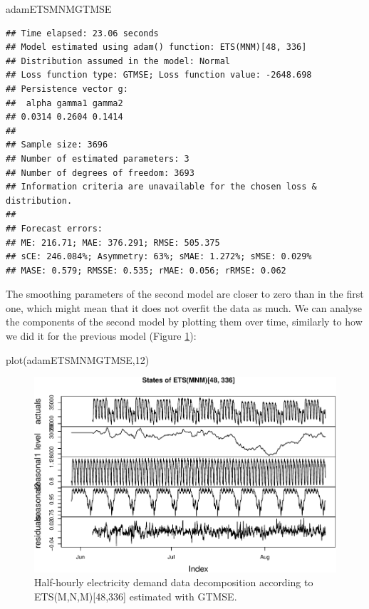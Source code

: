 \documentclass[
]{book}
\newenvironment{Shaded}{\begin{snugshade}}{\end{snugshade}}
\newcommand{\DecValTok}[1]{\textcolor[rgb]{0.00,0.00,0.81}{#1}}
\newcommand{\FunctionTok}[1]{\textcolor[rgb]{0.00,0.00,0.00}{#1}}
\newcommand{\NormalTok}[1]{#1}
\theoremstyle{definition}
\theoremstyle{definition}
\theoremstyle{definition}
\theoremstyle{definition}
\theoremstyle{remark}
\begin{document}
\begin{Shaded}
\begin{Highlighting}[]
\NormalTok{adamETSMNMGTMSE}
\end{Highlighting}
\end{Shaded}

\begin{verbatim}
## Time elapsed: 23.06 seconds
## Model estimated using adam() function: ETS(MNM)[48, 336]
## Distribution assumed in the model: Normal
## Loss function type: GTMSE; Loss function value: -2648.698
## Persistence vector g:
##  alpha gamma1 gamma2 
## 0.0314 0.2604 0.1414 
## 
## Sample size: 3696
## Number of estimated parameters: 3
## Number of degrees of freedom: 3693
## Information criteria are unavailable for the chosen loss & distribution.
## 
## Forecast errors:
## ME: 216.71; MAE: 376.291; RMSE: 505.375
## sCE: 246.084%; Asymmetry: 63%; sMAE: 1.272%; sMSE: 0.029%
## MASE: 0.579; RMSSE: 0.535; rMAE: 0.056; rRMSE: 0.062
\end{verbatim}

The smoothing parameters of the second model are closer to zero than in the first one, which might mean that it does not overfit the data as much. We can analyse the components of the second model by plotting them over time, similarly to how we did it for the previous model (Figure \ref{fig:adamModelETSMNMGTMSE12}):

\begin{Shaded}
\begin{Highlighting}[]
\FunctionTok{plot}\NormalTok{(adamETSMNMGTMSE,}\DecValTok{12}\NormalTok{)}
\end{Highlighting}
\end{Shaded}

\begin{figure}
\centering
\includegraphics{Svetunkov--2022----ADAM_files/figure-latex/adamModelETSMNMGTMSE12-1.pdf}
\caption{\label{fig:adamModelETSMNMGTMSE12}Half-hourly electricity demand data decomposition according to ETS(M,N,M){[}48,336{]} estimated with GTMSE.}
\end{figure}
\end{document}
